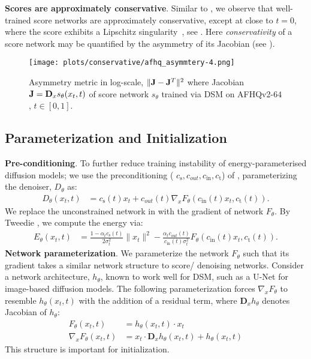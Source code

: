 \textbf{Scores are approximately conservative}.
Similar to \citet{lai2023fp}, we observe that well-trained score networks are approximately conservative, except at close to $t=0$, where the score exhibits a Lipschitz singularity~\citep{yang2023lipschitz}, see . Here \textit{conservativity} of a score network may be quantified by the asymmetry of its Jacobian (see ).

\begin{figure}[H]
    \centering
        \texttt{[image: plots/conservative/afhq\_asymmtery-4.png]}
    \caption{Asymmetry metric in log-scale, $\|\mathbf{J} - \mathbf{J}^T\|^2$ where Jacobian $\mathbf{J}=\mathbf{D}_x s_\theta(x_t,t)$ of score network $s_\theta$ trained via DSM on AFHQv2-$64$, $t\in[0,1]$.} 
    \label{fig:afhq_asymmtery}
\end{figure}


\newpage
\subsection{Parameterization and Initialization}
\textbf{Pre-conditioning}.
To further reduce training instability of energy-parameterised diffusion models; we use the preconditioning ( $c_\text{s}, c_{out}, c_\text{in}, c_\text{t}$) of \citet{karras2022elucidating}, parameterizing the denoiser, $D_\theta$ as:
\begin{align*}
    D_\theta(x_t,t) &= c_\text{s}(t)x_t + c_{out}(t)\nabla_x F_\theta(c_\text{in}(t)x_t,c_\text{t}(t)).
\end{align*} 
We replace the unconstrained network in \cite{karras2022elucidating} with the gradient of network $F_\theta$. By Tweedie \citep{efron_tweedie}, we compute the energy via:
\begin{align*}
    E_\theta(x_t,t) &= \tfrac{1-\alpha_t c_\text{s}(t)}{2\sigma_t^{2}}\|x_t\|^2
    -\tfrac{\alpha_t c_{out}(t)}{c_\text{in}(t)\sigma_t^{2}}F_\theta(c_\text{in}(t)x_t,c_\text{t}(t)).
\end{align*}
\textbf{Network parameterization}. We parameterize the network $F_\theta$ such that its gradient takes a similar network structure to score/ denoising networks. Consider a network architecture, $h_\theta$, known to work well for DSM, such as a U-Net for image-based diffusion models. The following parameterization forces $\nabla_x F_\theta$ to resemble $h_\theta(x_t,t)$ with the addition of a residual term, where $\mathbf{D}_x h_\theta$ denotes Jacobian of $h_\theta$:
\begin{align} \label{eq:parameterisation}
    F_\theta(x_t,t) &= h_\theta(x_t,t)\cdot x_t\\
    \nabla_x F_\theta(x_t,t) &= x_t \cdot \mathbf{D}_x h_\theta(x_t,t)+h_\theta(x_t,t)
\end{align}
This structure is important for initialization. 

